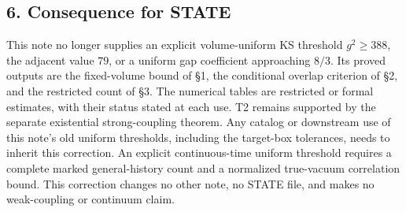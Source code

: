 \documentclass[11pt,a4paper]{article}
\begin{document}
\hypertarget{consequence-for-state}{%
\subsection{6. Consequence for STATE}\label{consequence-for-state}}

This note no longer supplies an explicit volume-uniform KS threshold
\(g^2\ge388\), the adjacent value \(79\), or a uniform gap coefficient
approaching \(8/3\). Its proved outputs are the fixed-volume bound of
§1, the conditional overlap criterion of §2, and the restricted count of
§3. The numerical tables are restricted or formal estimates, with their
status stated at each use. T2 remains supported by the separate
existential strong-coupling theorem. Any catalog or downstream use of
this note's old uniform thresholds, including the target-box tolerances,
needs to inherit this correction. An explicit continuous-time uniform
threshold requires a complete marked general-history count and a
normalized true-vacuum correlation bound. This correction changes no
other note, no STATE file, and makes no weak-coupling or continuum
claim.
\end{document}
